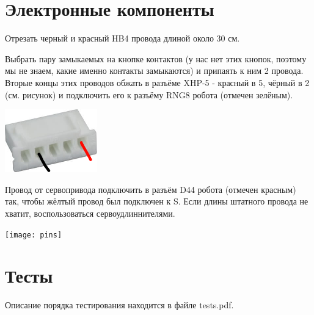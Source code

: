 \documentclass[12pt,a4paper,oneside]{article}
\begin{document}
\section{Электронные компоненты}
Отрезать черный и красный HB4 провода длиной около 30 см.

Выбрать пару замыкаемых на кнопке контактов (у нас нет этих кнопок, поэтому мы
не знаем, какие именно контакты замыкаются) и припаять к ним 2 провода. Вторые
концы этих проводов обжать в разъёме XHP-5 - красный в 5, чёрный в 2 (см.
рисунок) и подключить его к разъёму RNG8 робота (отмечен зелёным).

\includegraphics[width=0.3\textwidth]{buttoncontacts}

Провод от сервопривода подключить в разъём D44 робота (отмечен красным) так,
чтобы жёлтый провод был подключен к S. Если длины штатного провода не хватит,
воспользоваться сервоудлиннителями.

\texttt{[image: pins]}

\section{Тесты}
Описание порядка тестирования находится в файле tests.pdf.
\end{document}
